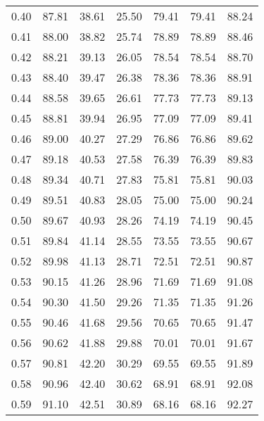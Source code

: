 \begin{tabular}{|c|c|c|c|c|c|c|}
      0.40 &     87.81 &     38.61 &      25.50 &   79.41 &      79.41 &         88.24 \\
      0.41 &     88.00 &     38.82 &      25.74 &   78.89 &      78.89 &         88.46 \\
      0.42 &     88.21 &     39.13 &      26.05 &   78.54 &      78.54 &         88.70 \\
      0.43 &     88.40 &     39.47 &      26.38 &   78.36 &      78.36 &         88.91 \\
      0.44 &     88.58 &     39.65 &      26.61 &   77.73 &      77.73 &         89.13 \\
      0.45 &     88.81 &     39.94 &      26.95 &   77.09 &      77.09 &         89.41 \\
      0.46 &     89.00 &     40.27 &      27.29 &   76.86 &      76.86 &         89.62 \\
      0.47 &     89.18 &     40.53 &      27.58 &   76.39 &      76.39 &         89.83 \\
      0.48 &     89.34 &     40.71 &      27.83 &   75.81 &      75.81 &         90.03 \\
      0.49 &     89.51 &     40.83 &      28.05 &   75.00 &      75.00 &         90.24 \\
      0.50 &     89.67 &     40.93 &      28.26 &   74.19 &      74.19 &         90.45 \\
      0.51 &     89.84 &     41.14 &      28.55 &   73.55 &      73.55 &         90.67 \\
      0.52 &     89.98 &     41.13 &      28.71 &   72.51 &      72.51 &         90.87 \\
      0.53 &     90.15 &     41.26 &      28.96 &   71.69 &      71.69 &         91.08 \\
      0.54 &     90.30 &     41.50 &      29.26 &   71.35 &      71.35 &         91.26 \\
      0.55 &     90.46 &     41.68 &      29.56 &   70.65 &      70.65 &         91.47 \\
      0.56 &     90.62 &     41.88 &      29.88 &   70.01 &      70.01 &         91.67 \\
      0.57 &     90.81 &     42.20 &      30.29 &   69.55 &      69.55 &         91.89 \\
      0.58 &     90.96 &     42.40 &      30.62 &   68.91 &      68.91 &         92.08 \\
      0.59 &     91.10 &     42.51 &      30.89 &   68.16 &      68.16 &         92.27 \\

\end{tabular}
